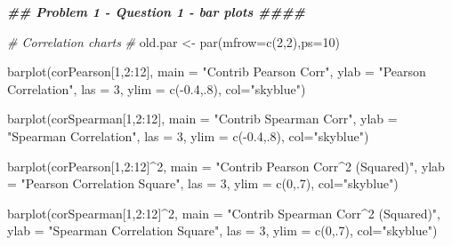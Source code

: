 \documentclass[
]{article}
\newenvironment{Shaded}{\begin{snugshade}}{\end{snugshade}}
\newcommand{\AttributeTok}[1]{\textcolor[rgb]{0.77,0.63,0.00}{#1}}
\newcommand{\CommentTok}[1]{\textcolor[rgb]{0.56,0.35,0.01}{\textit{#1}}}
\newcommand{\DecValTok}[1]{\textcolor[rgb]{0.00,0.00,0.81}{#1}}
\newcommand{\DocumentationTok}[1]{\textcolor[rgb]{0.56,0.35,0.01}{\textbf{\textit{#1}}}}
\newcommand{\FloatTok}[1]{\textcolor[rgb]{0.00,0.00,0.81}{#1}}
\newcommand{\FunctionTok}[1]{\textcolor[rgb]{0.00,0.00,0.00}{#1}}
\newcommand{\NormalTok}[1]{#1}
\newcommand{\OtherTok}[1]{\textcolor[rgb]{0.56,0.35,0.01}{#1}}
\newcommand{\SpecialCharTok}[1]{\textcolor[rgb]{0.00,0.00,0.00}{#1}}
\newcommand{\StringTok}[1]{\textcolor[rgb]{0.31,0.60,0.02}{#1}}
\begin{document}
\begin{Shaded}
\begin{Highlighting}[]
\DocumentationTok{\#\# Problem 1 {-} Question 1 {-} bar plots                                   \#\#\#\#}

\CommentTok{\# Correlation charts}
\CommentTok{\#}
\NormalTok{old.par }\OtherTok{\textless{}{-}} \FunctionTok{par}\NormalTok{(}\AttributeTok{mfrow=}\FunctionTok{c}\NormalTok{(}\DecValTok{2}\NormalTok{,}\DecValTok{2}\NormalTok{),}\AttributeTok{ps=}\DecValTok{10}\NormalTok{)}

\FunctionTok{barplot}\NormalTok{(corPearson[}\DecValTok{1}\NormalTok{,}\DecValTok{2}\SpecialCharTok{:}\DecValTok{12}\NormalTok{], }
        \AttributeTok{main =} \StringTok{"Contrib Pearson Corr"}\NormalTok{, }
        \AttributeTok{ylab =} \StringTok{"Pearson Correlation"}\NormalTok{,}
        \AttributeTok{las =} \DecValTok{3}\NormalTok{,}
        \AttributeTok{ylim =} \FunctionTok{c}\NormalTok{(}\SpecialCharTok{{-}}\FloatTok{0.4}\NormalTok{,.}\DecValTok{8}\NormalTok{),}
        \AttributeTok{col=}\StringTok{"skyblue"}\NormalTok{)}

\FunctionTok{barplot}\NormalTok{(corSpearman[}\DecValTok{1}\NormalTok{,}\DecValTok{2}\SpecialCharTok{:}\DecValTok{12}\NormalTok{], }
        \AttributeTok{main =} \StringTok{"Contrib Spearman Corr"}\NormalTok{,  }
        \AttributeTok{ylab =} \StringTok{"Spearman Correlation"}\NormalTok{,}
        \AttributeTok{las =} \DecValTok{3}\NormalTok{,}
        \AttributeTok{ylim =} \FunctionTok{c}\NormalTok{(}\SpecialCharTok{{-}}\FloatTok{0.4}\NormalTok{,.}\DecValTok{8}\NormalTok{),}
        \AttributeTok{col=}\StringTok{"skyblue"}\NormalTok{)}


\FunctionTok{barplot}\NormalTok{(corPearson[}\DecValTok{1}\NormalTok{,}\DecValTok{2}\SpecialCharTok{:}\DecValTok{12}\NormalTok{]}\SpecialCharTok{\^{}}\DecValTok{2}\NormalTok{, }
        \AttributeTok{main =} \StringTok{"Contrib Pearson Corr\^{}2 (Squared)"}\NormalTok{, }
        \AttributeTok{ylab =} \StringTok{"Pearson Correlation Square"}\NormalTok{,}
        \AttributeTok{las =} \DecValTok{3}\NormalTok{,}
        \AttributeTok{ylim =} \FunctionTok{c}\NormalTok{(}\DecValTok{0}\NormalTok{,.}\DecValTok{7}\NormalTok{),}
        \AttributeTok{col=}\StringTok{"skyblue"}\NormalTok{)}

\FunctionTok{barplot}\NormalTok{(corSpearman[}\DecValTok{1}\NormalTok{,}\DecValTok{2}\SpecialCharTok{:}\DecValTok{12}\NormalTok{]}\SpecialCharTok{\^{}}\DecValTok{2}\NormalTok{, }
        \AttributeTok{main =} \StringTok{"Contrib Spearman Corr\^{}2 (Squared)"}\NormalTok{,  }
        \AttributeTok{ylab =} \StringTok{"Spearman Correlation Square"}\NormalTok{,}
        \AttributeTok{las =} \DecValTok{3}\NormalTok{,}
        \AttributeTok{ylim =} \FunctionTok{c}\NormalTok{(}\DecValTok{0}\NormalTok{,.}\DecValTok{7}\NormalTok{),}
        \AttributeTok{col=}\StringTok{"skyblue"}\NormalTok{)}
\end{Highlighting}
\end{Shaded}
\end{document}
